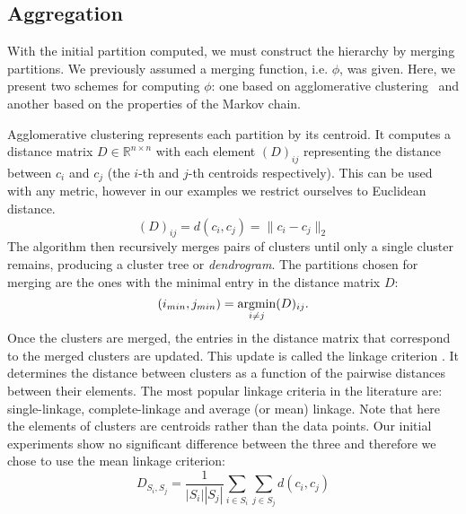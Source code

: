 
\subsection{Aggregation}
\label{sec:state-aggregation-impl}

With the initial partition computed, we must construct the hierarchy by merging partitions. We previously assumed a merging function, i.e. $\phi$, was given. Here, we present two schemes for computing $\phi$: one based on agglomerative clustering~\cite{Murtagh83} and another based on the properties of the Markov chain. 

Agglomerative clustering represents each partition by its centroid. It computes a distance matrix $D \in \mathbb{R}^{n \times n}$ with each element $(D)_{ij}$ representing the distance between $c_i$ and $c_j$ (the $i$-th and $j$-th centroids respectively). This can be used with any metric, however in our examples we restrict ourselves to Euclidean distance.
\begin{equation}
	\nonumber
	(D)_{ij} = d(c_i, c_j) = \|c_i - c_j\|_2
\end{equation}
The algorithm then recursively merges pairs of clusters until only a single cluster remains, producing a cluster tree or \emph{dendrogram}. The partitions chosen for merging are the ones with the minimal entry in the distance matrix $D$:
\begin{equation}
	\nonumber
	(i_{min},j_{min}) = \argmin\limits_{i \neq j}(D)_{ij}.
\end{equation}
Once the clusters are merged, the entries in the distance matrix that correspond to the merged clusters are updated. This update is called the linkage criterion \cite{Hartigan:1975:CA:540298}. It determines the distance between clusters as a function of the pairwise distances between their elements. The most popular linkage criteria in the literature are: single-linkage, complete-linkage and average (or mean) linkage. Note that here the elements of clusters are centroids rather than the data points. 
Our initial experiments show no significant difference between the three and therefore we chose to use the mean linkage criterion:
\begin{equation}
	\nonumber
	D_{S_i,S_j} = \frac{1}{\left|S_i\right|\left|S_j\right|}\sum\limits_{i \in S_i}\sum\limits_{j \in S_j} d(c_i,c_j)
\end{equation}
